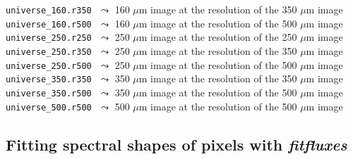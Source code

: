 \documentclass[a4paper,10pt]{article}
\begin{document}
{\small\verb!universe_160.r350!} $\,\,\leadsto$ 160 $\mu$m image at the resolution of the 350 $\mu$m image\\
{\small\verb!universe_160.r500!} $\,\,\leadsto$ 160 $\mu$m image at the resolution of the 500 $\mu$m image\\
{\small\verb!universe_250.r250!} $\,\,\leadsto$ 250 $\mu$m image at the resolution of the 250 $\mu$m image\\
{\small\verb!universe_250.r350!} $\,\,\leadsto$ 250 $\mu$m image at the resolution of the 350 $\mu$m image\\
{\small\verb!universe_250.r500!} $\,\,\leadsto$ 250 $\mu$m image at the resolution of the 500 $\mu$m image\\
{\small\verb!universe_350.r350!} $\,\,\leadsto$ 350 $\mu$m image at the resolution of the 350 $\mu$m image\\
{\small\verb!universe_350.r500!} $\,\,\leadsto$ 350 $\mu$m image at the resolution of the 500 $\mu$m image\\
{\small\verb!universe_500.r500!} $\,\,\leadsto$ 500 $\mu$m image at the resolution of the 500 $\mu$m image


\subsection{Fitting spectral shapes of pixels with \textsl{fitfluxes}}
\label{pixfitting}
\end{document}

